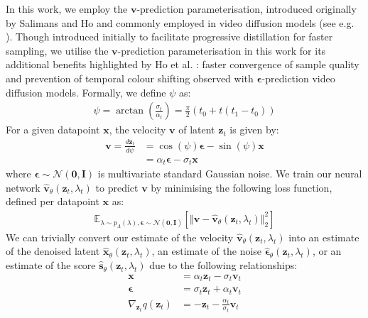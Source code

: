 \documentclass[ oneside,%
                    author={George Herbert},
                    degree={MSci},
                     title={Diffusion Models for Time-Evolving Precipitation Fields},
                  subtitle={}]{dissertation}
\begin{document}
In this work, we employ the $\mathbf{v}$-prediction parameterisation, introduced originally by Salimans and Ho \cite{Progressive_Distillation_Salimans} and commonly employed in video diffusion models (see e.g. \cite{VDM_Ho, Imagen_Video_Ho}). Though introduced initially to facilitate progressive distillation for faster sampling, we utilise the $\mathbf{v}$-prediction parameterisation in this work for its additional benefits highlighted by Ho et al. \cite{Imagen_Video_Ho}: faster convergence of sample quality and prevention of temporal colour shifting observed with $\boldsymbol\epsilon$-prediction video diffusion models. Formally, we define $\psi$ as:
\begin{align}
      \psi = \arctan\left(\frac{\sigma_t}{\alpha_t}\right)=\frac{\pi}{2}(t_0+t(t_1-t_0))
\end{align}
For a given datapoint $\mathbf{x}$, the velocity $\mathbf{v}$ of latent $\mathbf{z}_t$ is given by:
\begin{align}
      \mathbf{v}=\frac{d\mathbf{z}_t}{d\psi}&=\cos(\psi)\boldsymbol\epsilon-\sin(\psi)\mathbf{x}\\
      &=\alpha_t\boldsymbol\epsilon -\sigma_t\mathbf{x}
\end{align}
where $\boldsymbol\epsilon\sim\mathcal{N}(\mathbf{0}, \mathbf{I})$ is multivariate standard Gaussian noise. We train our neural network $\hat{\mathbf{v}}_\theta(\mathbf{z}_t,\lambda_t)$ to predict $\mathbf{v}$ by minimising the following loss function, defined per datapoint $\mathbf{x}$ as:
\begin{align}
      \mathbb{E}_{\lambda\sim p_\Lambda(\lambda),\boldsymbol\epsilon\sim\mathcal{N}(\mathbf{0},\mathbf{I})}\left[\Vert\mathbf{v}-\hat{\mathbf{v}}_\theta(\mathbf{z}_t, \lambda_t)\Vert_2^2\right]\label{eq:v_parameterisation_loss}
\end{align}
We can trivially convert our estimate of the velocity $\hat{\mathbf{v}}_\theta(\mathbf{z}_t,\lambda_t)$ into an estimate of the denoised latent $\hat{\mathbf{x}}_\theta(\mathbf{z}_t,\lambda_t)$, an estimate of the noise $\hat{\boldsymbol\epsilon}_\theta(\mathbf{z}_t,\lambda_t)$, or an estimate of the score $\hat{\mathbf{s}}_\theta(\mathbf{z}_t,\lambda_t)$ due to the following relationships:
\begin{align}
      \mathbf{x}&=\alpha_t\mathbf{z}_t-\sigma_t\mathbf{v}_t\\
      \boldsymbol\epsilon&=\sigma_t\mathbf{z}_t+\alpha_t\mathbf{v}_t\\
      \nabla_{\mathbf{z}_t}q(\mathbf{z}_t)&=-\mathbf{z}_t-\frac{\alpha_t}{\sigma_t}\mathbf{v}_t
\end{align}
\end{document}
